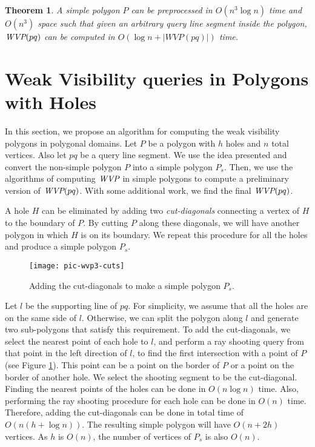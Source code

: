 \documentclass[5p]{elsarticle}
\newtheorem{theorem}{Theorem}
\def\WVP{\mbox{\it{WVP}}}
\def\P{\mbox{${P}$}}
\begin{document}
\begin{theorem}
\label{theom:weak_in_simple}
A simple polygon $\P$ can be preprocessed in $O(n^3 \log n)$ time and $O(n^3)$ space such
that given an arbitrary query line segment inside the polygon, 
$\WVP(pq)$ can be computed in $O(\log n + |WVP(pq)|)$ time.
\end{theorem}








\section{Weak Visibility queries in Polygons with Holes}
\label{sec:holes}
In this section, we propose an algorithm for 
computing the weak visibility polygons in polygonal domains. 
Let $\P$ be a polygon with $h$ holes and $n$ total vertices.
Also let $pq$ be a query line segment. 
We use the idea presented \cite{zarei} and convert the non-simple 
polygon $\P$ into a simple polygon $\P_s$. Then, we use the algorithms of computing $\WVP$ in 
simple polygons to compute a preliminary version of $\WVP(pq)$. With some additional work, 
we find the final $\WVP(pq)$.

A hole $H$ can be eliminated by adding two {\em cut-diagonals} connecting a vertex of 
$H$ to the boundary of $\P$. By cutting $\P$ along these diagonals, we will
have another polygon in which $H$ is on its boundary.
We repeat this procedure for all the holes and produce a simple polygon $\P_s$.


\begin{figure}[h]
  \centering
  \texttt{[image: pic-wvp3-cuts]}
  \caption{Adding the cut-diagonals to make a simple polygon $\P_s$.}
  \label{fig:wvp3-cuts}
\end{figure}

Let $l$ be the supporting line of $pq$.
For simplicity, we assume that all the holes are on the same side of $l$. Otherwise, we can
split the polygon along $l$ and generate two sub-polygons that satisfy this requirement.
To add the cut-diagonals, we select the nearest point of each hole
to $l$, and perform a ray shooting query from that point in the left direction of $l$,
to find the first intersection with a point of $\P$ (see Figure \ref{fig:wvp3-cuts}). 
This point can be a point on the border of $\P$
or a point on the border of another hole. We select the shooting segment to be the cut-diagonal.
Finding the nearest points of the holes can be done in $O(n\log n)$ time. Also,
performing the ray shooting procedure for each hole can be done in $O(n)$ time.
Therefore, adding the cut-diagonals can be done in total time of $O(n (h + \log n))$.
The resulting simple polygon will have $O(n+2h)$ vertices.
As $h$ is $O(n)$, the number of vertices of $\P_s$ is also $O(n)$.
\end{document}
